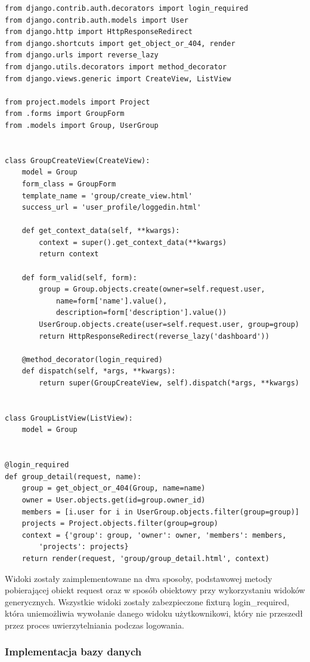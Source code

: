 \documentclass[12pt]{article}
\begin{document}
\begin{lstlisting}[caption={groups/views.py}]
from django.contrib.auth.decorators import login_required
from django.contrib.auth.models import User
from django.http import HttpResponseRedirect
from django.shortcuts import get_object_or_404, render
from django.urls import reverse_lazy
from django.utils.decorators import method_decorator
from django.views.generic import CreateView, ListView

from project.models import Project
from .forms import GroupForm
from .models import Group, UserGroup


class GroupCreateView(CreateView):
    model = Group
    form_class = GroupForm
    template_name = 'group/create_view.html'
    success_url = 'user_profile/loggedin.html'

    def get_context_data(self, **kwargs):
        context = super().get_context_data(**kwargs)
        return context

    def form_valid(self, form):
        group = Group.objects.create(owner=self.request.user,
            name=form['name'].value(),
            description=form['description'].value())
        UserGroup.objects.create(user=self.request.user, group=group)
        return HttpResponseRedirect(reverse_lazy('dashboard'))

    @method_decorator(login_required)
    def dispatch(self, *args, **kwargs):
        return super(GroupCreateView, self).dispatch(*args, **kwargs)


class GroupListView(ListView):
    model = Group


@login_required
def group_detail(request, name):
    group = get_object_or_404(Group, name=name)
    owner = User.objects.get(id=group.owner_id)
    members = [i.user for i in UserGroup.objects.filter(group=group)]
    projects = Project.objects.filter(group=group)
    context = {'group': group, 'owner': owner, 'members': members,
        'projects': projects}
    return render(request, 'group/group_detail.html', context)
\end{lstlisting}

    Widoki zostały zaimplementowane na dwa sposoby, podstawowej metody pobierającej obiekt request oraz w sposób obiektowy przy wykorzystaniu widoków generycznych. Wszystkie widoki zostały zabezpieczone fixturą login\_required, która uniemożliwia wywołanie danego widoku użytkownikowi, który nie przeszedł przez proces uwierzytelniania podczas logowania.  


\subsubsection{Implementacja bazy danych}
\end{document}
